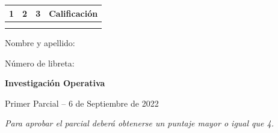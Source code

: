 \documentclass[a4paper,oneside,12pt]{amsart}
\newcommand{\nombremateria}
{Investigaci\'on Operativa}
\newcommand{\numeroparcial}
    { Primer Parcial }
\newcommand{\fecha}
    {6 de Septiembre de 2022}
\theoremstyle{definition}
\begin{document}
\hfill \hfill
\begin{tabular}[c]{|c|c|c|c|}
\hline 
1 & 2 & 3 & Calificaci\'on \\ \hline \hline
\hspace{1.2 cm} & \hspace{1.2 cm} & \hspace{1.2 cm} &\hspace{1.5 cm} \\
\hspace{1.2 cm} & \hspace{1.2 cm} & \hspace{1.2 cm} &\hspace{1.5 cm} \\ \hline

\end{tabular}

\vspace{-1cm}

\noindent Nombre y apellido:

\vspace{0.2cm}

\noindent Número de libreta:

\noindent \hrulefill 

\smallskip
\renewcommand{\baselinestretch}{1.1}

\begin{center}
	\large \textbf{\nombremateria} 
	
	\numeroparcial -- \fecha
\end{center}

\vspace{.6cm}
\renewcommand{\theenumi}{\textbf{\arabic{enumi}}}

\noindent\textit{Para aprobar el parcial deberá obtenerse un puntaje mayor o igual que 4.}

\end{document}

